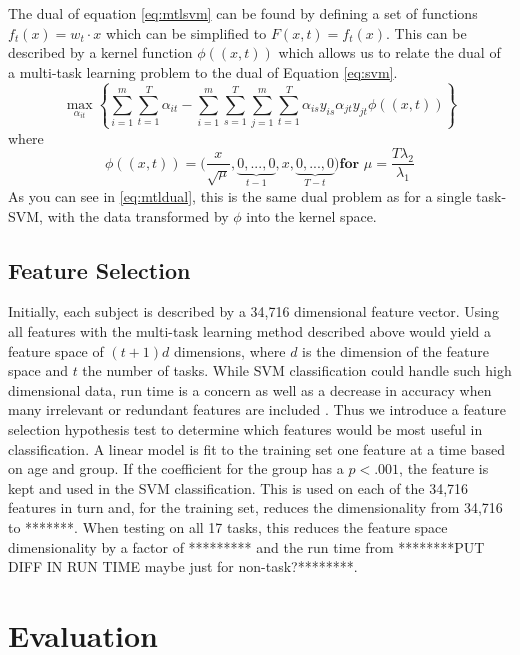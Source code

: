 \documentclass{llncs}
\begin{document}
The dual of equation \ref{eq:mtlsvm} can be found by defining a set of functions $f_t(x) = w_t \cdot x$ which can be simplified to $F(x,t) = f_t(x)$.  This can be described by a kernel function $\phi((x,t))$ which allows us to relate the dual of a multi-task learning problem to the dual of Equation \ref{eq:svm}. 
\begin{equation}
\label{eq:mtldual}
\max_{\alpha_{it}}  \left\{ \sum_{i=1}^m\sum_{t=1}^T \alpha_{it} -  \sum_{i=1}^m\sum_{s=1}^T\sum_{j=1}^m\sum_{t=1}^T  \alpha_{is}y_{is}\alpha_{jt}y_{jt}\phi((x,t))      \right\}
\end{equation}
where 
\begin{equation}
\phi((x,t)) = \big(\frac{x}{\sqrt{\mu}}, \underbrace{0,...,0}_{t-1}, x, \underbrace{0,...,0}_{T-t} \big)	\textbf{for  } \mu = \frac{T\lambda_2}{\lambda_1}
\end{equation}
As you can see in \ref{eq:mtldual}, this is the same dual problem as for a single task-SVM, with the data transformed by $\phi$ into the kernel space. 




\subsection{Feature Selection}
\label{subsec:FS}
Initially, each subject is described by a 34,716 dimensional feature vector.  Using all features with the multi-task learning method described above would yield a feature space of $(t+1)d$ dimensions, where $d$ is the dimension of the feature space and $t$ the number of tasks.  While SVM classification could handle such high dimensional data, run time is a concern as well as a decrease in accuracy when many irrelevant or redundant features are included \cite{featsel}.  Thus we introduce a feature selection hypothesis test to determine which features would be most useful in classification.  A linear model is fit to the training set one feature at a time based on age and group. If the coefficient for the group  has a $p < .001$, the feature is kept and used in the SVM classification. This is used on each of the 34,716 features in turn and, for the training set, reduces the dimensionality from 34,716 to   *******.  When testing on all 17 tasks, this reduces the feature space dimensionality by a factor of ********* and the run time from ********PUT DIFF IN RUN TIME maybe just for non-task?********. 
\section{Evaluation}
\end{document}
